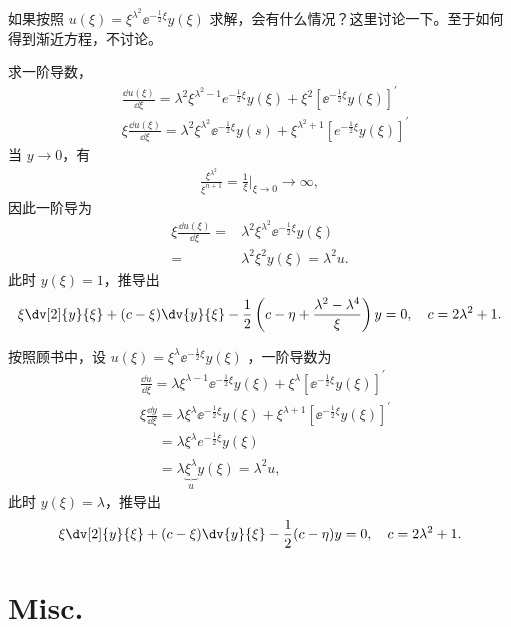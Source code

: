 如果按照 $u(\xi) = \xi^{\lambda^2} \ee^{-\frac12\xi}y(\xi)$ 求解，会有什么情况？这里讨论一下。至于如何得到渐近方程，不讨论。

求一阶导数，
\begin{align}
    &\frac{\dd u(\xi)}{\dd \xi}=\lambda^2 \xi^{\lambda^2-1} e^{-\frac{1}{2} \xi} y(\xi)+\xi^2\left[\ee^{-\frac{1}{2} \xi} y(\xi)\right]^{\prime} \\
    &\xi \frac{\dd u(\xi)}{\dd \xi}=\lambda^2 \xi^{\lambda^2} \ee^{-\frac{1}{2} \xi} y(s)+\xi^{\lambda^2+1}\left[e^{-\frac{1}{2} \xi} y(\xi)\right]^{\prime}
\end{align}
当 $y\rightarrow0$，有
\begin{align}
    \frac{\xi^{\lambda^2}}{\xi^{n+1}}=\frac{1}{\xi}\Big|_{\xi \rightarrow 0} \rightarrow \infty,
\end{align}
因此一阶导为
\begin{align}
    \xi \frac{\dd u(\xi)}{\dd \xi}={}& \lambda^2 \xi^{\lambda^2} \ee^{-\frac{1}{2} \xi} y(\xi) \\
    ={}&\lambda^2 \xi^2 y(\xi)=\lambda^2 u. 
\end{align}
此时 $y(\xi) = 1$，推导出
\begin{align}
    \xi \dv[2]{y}{\xi} + (c-\xi) \dv{y}{\xi} - \frac12\left(
        c - \eta + \frac{\lambda^2 - \lambda^4}{\xi}    \right) y = 0, \quad c = 2\lambda^2 + 1. 
\end{align}

按照顾书中，设 $u(\xi) = \xi^{\lambda} \ee^{-\frac12\xi}y(\xi)$ ，一阶导数为
\begin{align}
    &\frac{\dd u}{\dd \xi}=\lambda \xi^{\lambda-1} \ee^{-\frac{1}{2} \xi} y(\xi)+\xi^\lambda\left[\ee^{-\frac{1}{2} \xi} y(\xi)\right]^{\prime} \\
    &\xi \frac{\dd y}{\dd \xi}=\lambda \xi^\lambda \ee^{-\frac{1}{2} \xi} y(\xi)+\xi^{\lambda+1}\left[\ee^{-\frac{1}{2} \xi} y(\xi)\right]^{\prime}\\
    &\phantom{\xi \frac{\dd y}{\dd \xi}}=\lambda \xi^\lambda e^{-\frac{1}{2} \xi} y(\xi) \\
    &\phantom{\xi \frac{\dd y}{\dd \xi}}=\lambda \underbrace{\xi^\lambda}_{u} y(\xi)=\lambda^2 u,
\end{align}
此时 $y(\xi) = \lambda$，推导出
\begin{align}
    \xi \dv[2]{y}{\xi} + (c-\xi) \dv{y}{\xi} - \frac12 (c-\eta) y = 0,
    \quad c = 2\lambda^2 + 1. 
\end{align}

\chapter{Misc.}

